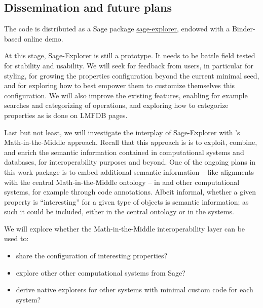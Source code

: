 \documentclass{deliverablereport}
\begin{document}
\subsection{Dissemination and future plans}

The code is distributed as a Sage package
\href{https://github.com/sagemath/sage-explorer/}{sage-explorer},
endowed with a Binder-based online demo.

At this stage, Sage-Explorer is still a prototype. It needs to be
battle field tested for stability and usability. We will seek for
feedback from users, in particular for styling, for growing the
properties configuration beyond the current minimal seed, and for
exploring how to best empower them to customize themselves this
configuration. We will also improve the existing features, enabling
for example searches and categorizing of operations, and exploring how
to categorize properties as is done on LMFDB pages.

Last but not least, we will investigate the interplay of Sage-Explorer
with 's Math-in-the-Middle approach. Recall that this
approach is is to exploit, combine, and enrich the semantic
information contained in computational systems and databases, for
interoperability purposes and beyond. One of the ongoing plans in this
work package is to embed additional semantic information -- like
alignments with the central Math-in-the-Middle ontology -- in \Sage
and other computational systems, for example through code annotations.
Albeit informal, whether a given property is “interesting” for a given
type of objects is semantic information; as such it could be included,
either in the central ontology or in the systems.

We will explore whether the Math-in-the-Middle interoperability layer
can be used to:
\begin{itemize}
\item share the configuration of interesting properties?
\item explore other other computational systems from Sage?
\item derive native explorers for other systems with minimal custom
  code for each system?
\end{itemize}




\end{document}
